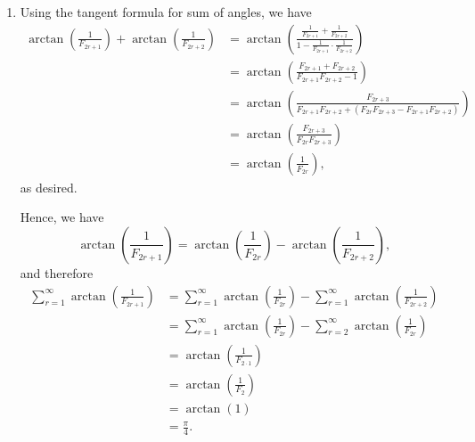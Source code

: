 \begin{enumerate}
    \item Using the tangent formula for sum of angles, we have
          \begin{align*}
              \arctan \left(\frac{1}{F_{2r + 1}}\right) + \arctan \left(\frac{1}{F_{2r + 2}}\right) & = \arctan \left(\frac{\frac{1}{F_{2r + 1}} + \frac{1}{F_{2r + 2}}}{1 - \frac{1}{F_{2r + 1}} \cdot \frac{1}{F_{2r + 2}}}\right) \\
                                                                                                    & = \arctan \left(\frac{F_{2r + 1} + F_{2r + 2}}{F_{2r + 1} F_{2r + 2} - 1}\right)                                               \\
                                                                                                    & = \arctan \left(\frac{F_{2r + 3}}{F_{2r + 1} F_{2r + 2} + (F_{2r} F_{2r + 3} - F_{2r + 1} F_{2r + 2})}\right)                  \\
                                                                                                    & = \arctan \left(\frac{F_{2r + 3}}{F_{2r} F_{2r + 3}}\right)                                                                    \\
                                                                                                    & = \arctan \left(\frac{1}{F_{2r}}\right),
          \end{align*}
          as desired.

          Hence, we have
          \[
              \arctan \left(\frac{1}{F_{2r + 1}}\right) = \arctan \left(\frac{1}{F_{2r}}\right) - \arctan \left(\frac{1}{F_{2r + 2}}\right),
          \]
          and therefore
          \begin{align*}
              \sum_{r = 1}^{\infty} \arctan \left(\frac{1}{F_{2r + 1}}\right) & = \sum_{r = 1}^{\infty} \arctan \left(\frac{1}{F_{2r}}\right) - \sum_{r = 1}^{\infty} \arctan \left(\frac{1}{F_{2r + 2}}\right) \\
                                                                              & = \sum_{r = 1}^{\infty} \arctan \left(\frac{1}{F_{2r}}\right) - \sum_{r = 2}^{\infty} \arctan \left(\frac{1}{F_{2r}}\right)     \\
                                                                              & = \arctan \left(\frac{1}{F_{2 \cdot 1}}\right)                                                                                  \\
                                                                              & = \arctan \left(\frac{1}{F_2}\right)                                                                                            \\
                                                                              & = \arctan \left(1\right)                                                                                                        \\
                                                                              & = \frac{\pi}{4}.
          \end{align*}
\end{enumerate}